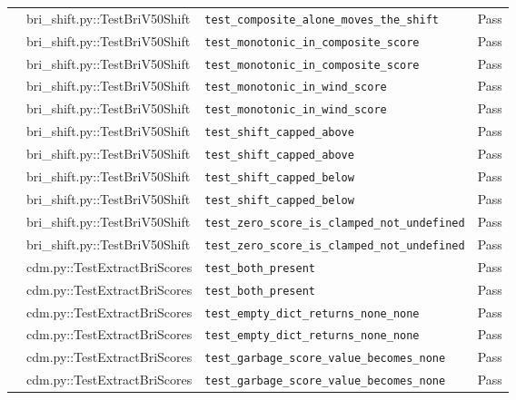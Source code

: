 \documentclass[11pt,a4paper]{article}
\begin{document}
\begin{center}
\begin{longtable}{p{2.2cm} p{4.5cm} p{6.5cm} p{1.4cm}}
     & bri\_shift.py::TestBriV50Shift & \texttt{test\_composite\_alone\_moves\_the\_shift} & \textcolor{green!60!black}{Pass} \\
     & bri\_shift.py::TestBriV50Shift & \texttt{test\_monotonic\_in\_composite\_score} & \textcolor{green!60!black}{Pass} \\
     & bri\_shift.py::TestBriV50Shift & \texttt{test\_monotonic\_in\_composite\_score} & \textcolor{green!60!black}{Pass} \\
     & bri\_shift.py::TestBriV50Shift & \texttt{test\_monotonic\_in\_wind\_score} & \textcolor{green!60!black}{Pass} \\
     & bri\_shift.py::TestBriV50Shift & \texttt{test\_monotonic\_in\_wind\_score} & \textcolor{green!60!black}{Pass} \\
     & bri\_shift.py::TestBriV50Shift & \texttt{test\_shift\_capped\_above} & \textcolor{green!60!black}{Pass} \\
     & bri\_shift.py::TestBriV50Shift & \texttt{test\_shift\_capped\_above} & \textcolor{green!60!black}{Pass} \\
     & bri\_shift.py::TestBriV50Shift & \texttt{test\_shift\_capped\_below} & \textcolor{green!60!black}{Pass} \\
     & bri\_shift.py::TestBriV50Shift & \texttt{test\_shift\_capped\_below} & \textcolor{green!60!black}{Pass} \\
     & bri\_shift.py::TestBriV50Shift & \texttt{test\_zero\_score\_is\_clamped\_not\_undefined} & \textcolor{green!60!black}{Pass} \\
     & bri\_shift.py::TestBriV50Shift & \texttt{test\_zero\_score\_is\_clamped\_not\_undefined} & \textcolor{green!60!black}{Pass} \\
     & cdm.py::TestExtractBriScores & \texttt{test\_both\_present} & \textcolor{green!60!black}{Pass} \\
     & cdm.py::TestExtractBriScores & \texttt{test\_both\_present} & \textcolor{green!60!black}{Pass} \\
     & cdm.py::TestExtractBriScores & \texttt{test\_empty\_dict\_returns\_none\_none} & \textcolor{green!60!black}{Pass} \\
     & cdm.py::TestExtractBriScores & \texttt{test\_empty\_dict\_returns\_none\_none} & \textcolor{green!60!black}{Pass} \\
     & cdm.py::TestExtractBriScores & \texttt{test\_garbage\_score\_value\_becomes\_none} & \textcolor{green!60!black}{Pass} \\
     & cdm.py::TestExtractBriScores & \texttt{test\_garbage\_score\_value\_becomes\_none} & \textcolor{green!60!black}{Pass} \\

\end{longtable}
\end{center}
\end{document}

